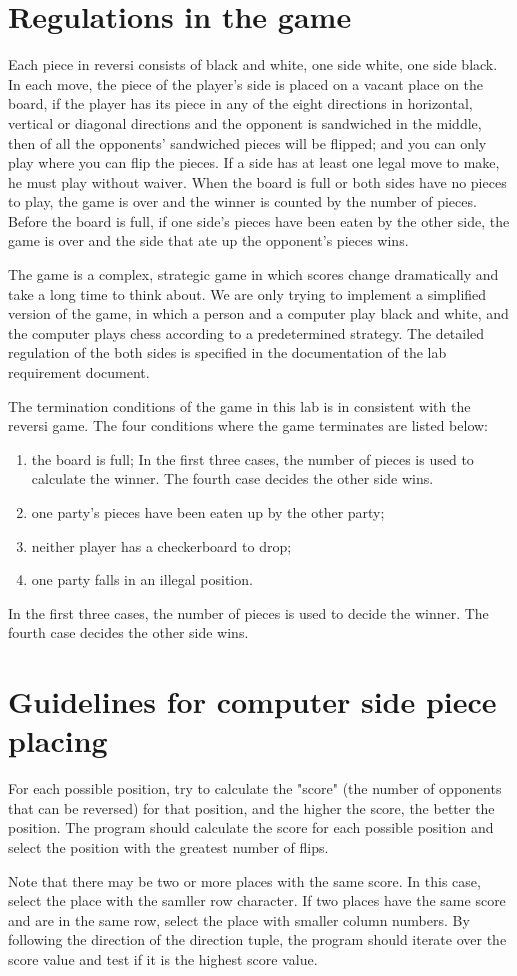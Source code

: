 \documentclass[a4paper]{report}
\begin{document}
\section{Regulations in the game}
Each piece in reversi consists of black and white, one side white, one side black. In each move, the piece of the player's side is placed on a vacant place on the board, if the player has its piece in any of the eight directions in horizontal, vertical or diagonal directions and the opponent is sandwiched in the middle, then of all the opponents' sandwiched pieces will be flipped; and you can only play where you can flip the pieces. If a side has at least one legal move to make, he must play without waiver. When the board is full or both sides have no pieces to play, the game is over and the winner is counted by the number of pieces. Before the board is full, if one side's pieces have been eaten by the other side, the game is over and the side that ate up the opponent's pieces wins. 
\par
The game is a complex, strategic game in which scores change dramatically and take a long time to think about. We are only trying to implement a simplified version of the game, in which a person and a computer play black and white, and the computer plays chess according to a predetermined strategy. The detailed regulation of the both sides is specified in the  documentation of the lab requirement document.
\par
The termination conditions of the game in this lab is in consistent with the reversi game. The four conditions where the game terminates are listed below:

\begin{enumerate}
\item the board is full; In the first three cases, the number of pieces is used to calculate the winner. The fourth case decides the other side wins.
\item one party's pieces have been eaten up by the other party; 
\item neither player has a checkerboard to drop;
\item one party falls in an illegal position.
\end{enumerate}
In the first three cases, the number of pieces is used to decide the winner. The fourth case decides the other side wins.
\section{Guidelines for computer side piece placing}
For each possible position, try to calculate the "score" (the number of opponents that can be reversed) for that position, and the higher the score, the better the position. The program should calculate the score for each possible position and select the position with the greatest number of flips. 
\par
Note that there may be two or more places with the same score. In this case, select the place with the samller row character. If two places have the same score and are in the same row, select the place with smaller column numbers. By following the direction of the direction tuple, the program should iterate over the score value and test if it is the highest score value.
\end{document}
